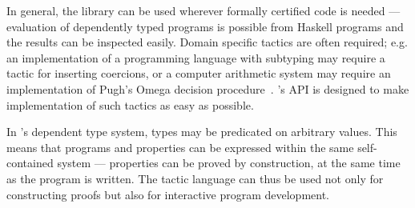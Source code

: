 In general, the library can be used wherever formally certified code
is needed --- evaluation of dependently typed \Ivor{} programs is
possible from Haskell programs and the results can be inspected
easily.  Domain specific tactics are often required; e.g. an
implementation of a programming language with subtyping may require a
tactic for inserting coercions, or a computer arithmetic system may
require an implementation of Pugh's Omega decision
procedure~\cite{pugh-omega}.  \Ivor{}'s API is designed to make
implementation of such tactics as easy as possible.

In \Ivor{}'s dependent type system, types may be predicated on
arbitrary values. This means that programs and properties can be
expressed within the same self-contained system --- properties can be
proved by construction, at the same time as the program is
written. The tactic language can thus be used not only for
constructing proofs but also for interactive program development.


